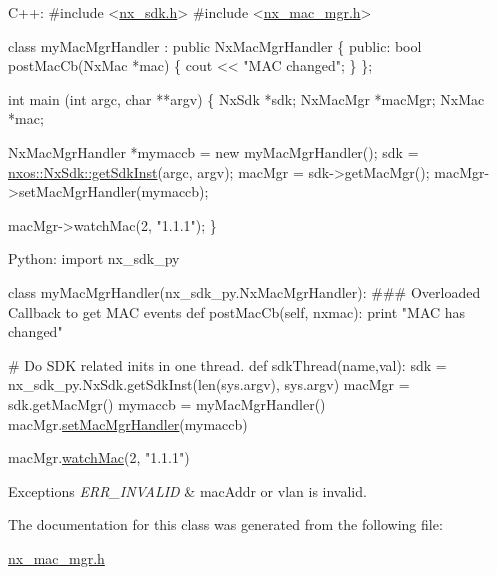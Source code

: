 \begin{DoxyCode}
C++:
\textcolor{preprocessor}{     #include <\mbox{\hyperlink{nx__sdk_8h}{nx\_sdk.h}}>}
\textcolor{preprocessor}{     #include <\mbox{\hyperlink{nx__mac__mgr_8h}{nx\_mac\_mgr.h}}>}

     \textcolor{keyword}{class }myMacMgrHandler : \textcolor{keyword}{public} NxMacMgrHandler \{
        \textcolor{keyword}{public}:
           \textcolor{keywordtype}{bool} postMacCb(NxMac *mac) \{
                cout << \textcolor{stringliteral}{"MAC changed"};
           \}
     \};

     \textcolor{keywordtype}{int}  main (\textcolor{keywordtype}{int} argc, \textcolor{keywordtype}{char} **argv)
     \{
          NxSdk    *sdk;
          NxMacMgr *macMgr;
          NxMac    *mac;

          NxMacMgrHandler *mymaccb = \textcolor{keyword}{new} myMacMgrHandler();
          sdk = \mbox{\hyperlink{classnxos_1_1_nx_sdk_a5050e2d26c40744b4fc7862068a83f39}{nxos::NxSdk::getSdkInst}}(argc, argv);
          macMgr = sdk->getMacMgr();
          macMgr->setMacMgrHandler(mymaccb);

          macMgr->watchMac(2, \textcolor{stringliteral}{"1.1.1"});
     \}

Python:
   \textcolor{keyword}{import} nx\_sdk\_py

   \textcolor{keyword}{class }myMacMgrHandler(nx\_sdk\_py.NxMacMgrHandler):
\textcolor{preprocessor}{   ### Overloaded Callback to get MAC events}
         def postMacCb(self, nxmac):
             print "MAC has changed"

\textcolor{preprocessor}{   # Do SDK related inits in one thread.}
   def sdkThread(name,val):
       sdk = nx\_sdk\_py.NxSdk.getSdkInst(len(sys.argv), sys.argv)
       macMgr = sdk.getMacMgr()
       mymaccb = myMacMgrHandler()
       macMgr.\mbox{\hyperlink{classnxos_1_1_nx_mac_mgr_a06f53bd41ddb17e6cfaef5a02b00415d}{setMacMgrHandler}}(mymaccb)

       macMgr.\mbox{\hyperlink{classnxos_1_1_nx_mac_mgr_a12dde38c22d9a27e1e3bde318d418134}{watchMac}}(2, "1.1.1")
\end{DoxyCode}



\begin{DoxyExceptions}{Exceptions}
{\em E\+R\+R\+\_\+\+I\+N\+V\+A\+L\+ID} & mac\+Addr or vlan is invalid. \\
\hline
\end{DoxyExceptions}


The documentation for this class was generated from the following file\+:\begin{DoxyCompactItemize}
\item 
\mbox{\hyperlink{nx__mac__mgr_8h}{nx\+\_\+mac\+\_\+mgr.\+h}}\end{DoxyCompactItemize}
